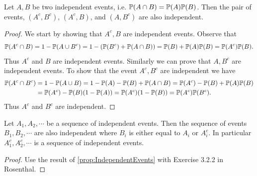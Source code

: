 \begin{proposition}
	\label{prop:IndependentEvents}
	Let $ A,B $ be two independent events, i.e. $ \mathbb{P}(A\cap B) = \mathbb{P}(A) \mathbb{P}(B) $. Then the pair of events, $ (A^c, B^c) $, $ (A^c,B) $, and $ (A,B^c) $ are also independent.
\end{proposition}
\begin{proof}
	We start by showing that $ A^c, B $ are independent events. Observe that
	\[ \mathbb{P}(A^c\cap B) = 1 - \mathbb{P}(A\cup B^c) = 1 - (\mathbb{P}(B^c)+\mathbb{P}(A\cap B)) = \mathbb{P}(B) + \mathbb{P}(A)\mathbb{P}(B) = \mathbb{P}(A^c) \mathbb{P}(B). \]
	Thus $ A^c $ and $ B $ are independent events. Similarly we can prove that $ A,B^c $ are independent events. To show that the event $ A^c, B^c $ are independent we have
	\begin{align*}
		\mathbb{P}(A^c\cap B^c) &= 1 - \mathbb{P}(A\cup B) = 1 - \mathbb{P}(A) - \mathbb{P}(B) + \mathbb{P}(A\cap B) = \mathbb{P}(A^c) - \mathbb{P}(B) + \mathbb{P}(A)\mathbb{P}(B) \\
		&= \mathbb{P}(A^c)-\mathbb{P}(B)(1-\mathbb{P}(A)) = \mathbb{P}(A^c)(1-\mathbb{P}(B)) = \mathbb{P}(A^c)\mathbb{P}(B^c). 
	\end{align*}
	Thus $ A^c $ and $ B^c $ are independent.
\end{proof}

\begin{proposition}
	\label{prop:SeqIndependentEvents}
	Let $ A_1,A_2,\cdots $ be a sequence of independent events. Then the sequence of events $ B_1,B_2,\cdots $ are also independent where $ B_i $ is either equal to $ A_i $ or $ A_i^c $. In particular $ A_1^c, A_2^c,\cdots $ is a sequence of independent events.
\end{proposition}
\begin{proof}
 	Use the result of \autoref{prop:IndependentEvents} with Exercise 3.2.2 in Rosenthal.
\end{proof}
 
